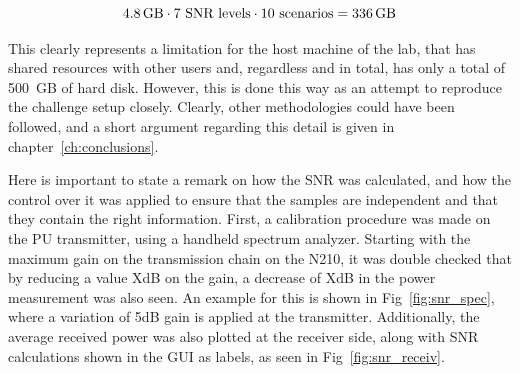\begin{equation}
    \SI{4.8}{\giga\byte} \cdot 7 \text{ SNR levels} \cdot 10 \text{ scenarios} = \SI{336}{\giga\byte}
\end{equation}

This clearly represents a limitation for the host machine of the lab, that has shared resources with other users and, regardless and in total, has only a total of \SI{500}{GB} of hard disk. However, this is done this way as an attempt to reproduce the challenge setup closely. Clearly, other methodologies could have been followed, and a short argument regarding this detail is given in chapter~\ref{ch:conclusions}.

Here is important to state a remark on how the \ac{SNR} was calculated, and how the control over it was applied to ensure that the samples are independent and that they contain the right information. First, a calibration procedure was made on the \ac{PU} transmitter, using a handheld spectrum analyzer. Starting with the maximum gain on the transmission chain on the N210, it was double checked that by reducing a value XdB on the gain, a decrease of XdB in the power measurement was also seen. An example for this is shown in Fig~\ref{fig:snr_spec}, where a variation of 5dB gain is applied at the transmitter. Additionally, the average received power was also plotted at the receiver side, along with SNR calculations shown in the GUI as labels, as seen in Fig~\ref{fig:snr_receiv}.

